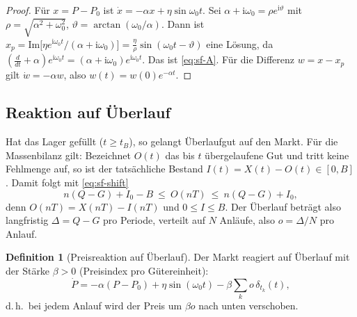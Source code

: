 \documentclass[a4paper, 12pt, twoside, openright]{report}
\theoremstyle{definition}
\newtheorem{definition}[theorem]{Definition}
\theoremstyle{definition}
\begin{document}
\begin{proof}
Für $x=P-P_0$ ist $\dot x=-\alpha x+\eta\sin\omega_0t$. Sei $\alpha+\mathrm{i}\omega_0=\rho e^{\mathrm{i}\vartheta}$ mit
$\rho=\sqrt{\alpha^2+\omega_0^2}$, $\vartheta=\arctan(\omega_0/\alpha)$. Dann ist
$x_p=\mathrm{Im}\bigl[\eta e^{\mathrm{i}\omega_0t}/(\alpha+\mathrm{i}\omega_0)\bigr]
=\frac{\eta}{\rho}\sin(\omega_0t-\vartheta)$ eine Lösung, da
$(\frac{d}{dt}+\alpha)e^{\mathrm{i}\omega_0t}=(\alpha+\mathrm{i}\omega_0)e^{\mathrm{i}\omega_0t}$. Das ist
\eqref{eq:sf-A}. Für die Differenz $w=x-x_p$ gilt $\dot w=-\alpha w$, also
$w(t)=w(0)e^{-\alpha t}$.
\end{proof}

\subsection{Reaktion auf Überlauf}

Hat das Lager gefüllt ($t\ge t_B$), so gelangt Überlaufgut auf den Markt. Für die
Massenbilanz gilt: Bezeichnet $O(t)$ das bis $t$ übergelaufene Gut und tritt keine
Fehlmenge auf, so ist der tatsächliche Bestand $I(t)=X(t)-O(t)\in[0,B]$. Damit folgt
mit \eqref{eq:sf-shift}
\begin{equation}
  n(Q-G)+I_0-B\ \le\ O(nT)\ \le\ n(Q-G)+I_0 ,
  \label{eq:sf-O}
\end{equation}
denn $O(nT)=X(nT)-I(nT)$ und $0\le I\le B$. Der Überlauf beträgt also langfristig
$\Delta=Q-G$ pro Periode, verteilt auf $N$ Anläufe, also $o=\Delta/N$ pro Anlauf.

\begin{definition}[Preisreaktion auf Überlauf]\label{def:sf-preisreaktion}
Der Markt reagiert auf Überlauf mit der Stärke $\beta>0$ (Preisindex pro
Gütereinheit):
\begin{equation}
  \dot P=-\alpha(P-P_0)+\eta\sin(\omega_0t)-\beta\sum_{k}o\,\delta_{t_k}(t),
  \label{eq:sf-Pimp}
\end{equation}
d.\,h.\ bei jedem Anlauf wird der Preis um $\beta o$ nach unten verschoben.
\end{definition}
\end{document}
